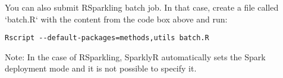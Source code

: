 You can also submit RSparkling batch job. In that case, create a file called `batch.R` with the content
from the code box above and run:

\begin{lstlisting}[style=Bash]
Rscript --default-packages=methods,utils batch.R
\end{lstlisting}

Note: In the case of RSparkling, SparklyR automatically sets the Spark deployment mode and it is not possible to specify it.

